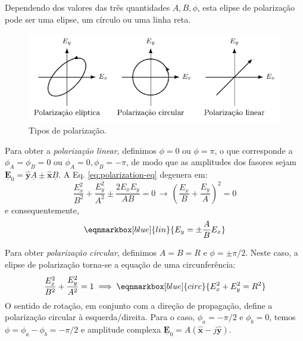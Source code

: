 \begin{check}
    Dependendo dos valores das três quantidades ${A, B, \phi}$, esta elipse de polarização pode ser uma elipse, um círculo ou uma linha reta. 

    \begin{figure}[H]
        \centering
        \includegraphics[width=0.75\linewidth]{img/1/Polarization.pdf}
        \caption{Tipos de polarização.}
    \end{figure}
\end{check}
\clearpage
Para obter a \textit{polarização linear}, definimos $\phi = 0$ ou $\phi = \pi$, o que corresponde a $\phi_A = \phi_B = 0$ ou $\phi_A = 0, \phi_B = -\pi$, de modo que as amplitudes dos fasores sejam $\mathbf{\underline{E}}_0 = \mathbf{\hat{y}}\underline{A} \pm \mathbf{\hat{x}}\underline{B}$. A Eq. \eqref{eq:polarization-eq} degenera em:
\begin{equation}
    \dfrac{E_{x}^2}{B^2} + \dfrac{E_{y}^2}{A^2} \pm \dfrac{2E_{x}E_{y}}{AB} = 0\,\rightarrow\, 
    \boxed{\left(\dfrac{E_{x}}{B} + \dfrac{E_{y}}{A}\right)^2 = 0}
\end{equation}
e consequentemente,
\begin{equation}
    \eqnmarkbox[blue]{lin}{E_{y} = \pm \dfrac{A}{B}E_{x}}
\end{equation}

Para obter \textit{polarização circular}, definimos $A = B = R$ e $\phi = \pm \pi/2$. Neste caso, a elipse de polarização torna-se a equação de uma circunferência:
\begin{equation}
    \frac{E_{x}^2}{B^2} + \frac{E_{y}^2}{A^2} = 1
    \implies \eqnmarkbox[blue]{circ}{E_{x}^2 + E_{y}^2 = R^2}
\end{equation}
O sentido de rotação, em conjunto com a direção de propagação, define a polarização circular à esquerda/direita. Para o caso, $ \phi_a = -\pi/2 $ e $ \phi_b = 0 $, temos $\phi = \phi_a - \phi_b = -\pi/2$ e amplitude complexa $ \mathbf{\underline{E}}_0 = A(\mathbf{\hat{x}} - j\mathbf{\hat{y}}) $.

